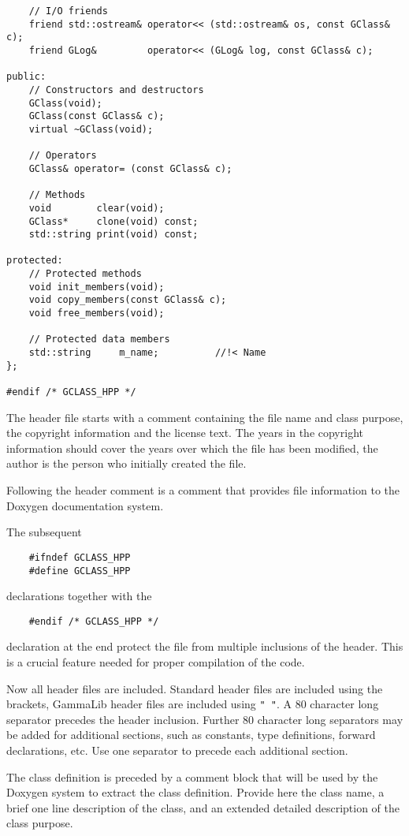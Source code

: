 \documentclass{article}[12pt,a4]
\begin{document}
\begin{verbatim}
    // I/O friends
    friend std::ostream& operator<< (std::ostream& os, const GClass& c);
    friend GLog&         operator<< (GLog& log, const GClass& c);

public:
    // Constructors and destructors
    GClass(void);
    GClass(const GClass& c);
    virtual ~GClass(void);
 
    // Operators
    GClass& operator= (const GClass& c);

    // Methods
    void        clear(void);
    GClass*     clone(void) const;
    std::string print(void) const;
  
protected:
    // Protected methods
    void init_members(void);
    void copy_members(const GClass& c);
    void free_members(void);

    // Protected data members
    std::string     m_name;          //!< Name
};

#endif /* GCLASS_HPP */
\end{verbatim}

The header file starts with a comment containing the file name and class purpose, the
copyright information and the license text.
The years in the copyright information should cover the years over which the file has been
modified, the author is the person who initially created the file.

Following the header comment is a comment that provides file information to the
Doxygen documentation system.

The subsequent
\begin{verbatim}
    #ifndef GCLASS_HPP
    #define GCLASS_HPP
\end{verbatim}
declarations together with the 
\begin{verbatim}
    #endif /* GCLASS_HPP */
\end{verbatim}
declaration at the end protect the file from multiple inclusions of the header.
This is a crucial feature needed for proper compilation of the code.

Now all header files are included.
Standard header files are included using the {\tt < >} brackets, GammaLib header files are included
using {\tt " "}.
A 80 character long separator precedes the header inclusion.
Further 80 character long separators may be added for additional sections, such as
constants, type definitions, forward declarations, etc.
Use one separator to precede each additional section.

The class definition is preceded by a comment block that will be used by the Doxygen system
to extract the class definition.
Provide here the class name, a brief one line description of the class, and an extended
detailed description of the class purpose.
\end{document}

